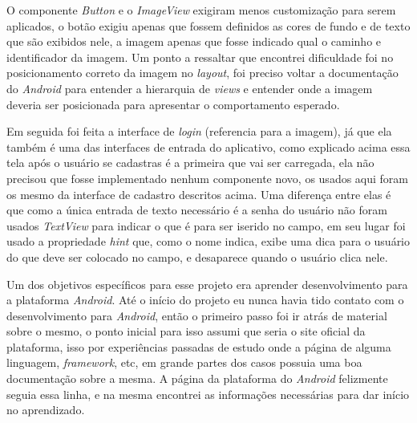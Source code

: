 \documentclass[hidelinks,12pt]{article}
\begin{document}
O componente \textit{Button} e o \textit{ImageView} exigiram menos customiza\c{c}\~ao para serem aplicados, o bot\~ao exigiu apenas que fossem definidos as cores de fundo e de texto que s\~ao exibidos nele, a imagem apenas que fosse indicado qual o caminho e identificador da imagem. Um ponto a ressaltar que encontrei dificuldade foi no posicionamento correto da imagem no \textit{layout}, foi preciso voltar a documenta\c{c}\~ao do \textit{Android} para entender a hierarquia de \textit{views} \cite{viewslay} e entender onde a imagem deveria ser posicionada para apresentar o comportamento esperado.

Em seguida foi feita a interface de \textit{login} (referencia para a imagem), j\'a que ela tamb\'em \'e uma das interfaces de entrada do aplicativo, como explicado acima essa tela ap\'os o usu\'ario se cadastras \'e a primeira que vai ser carregada, ela n\~ao precisou que fosse implementado nenhum componente novo, os usados aqui foram os mesmo da interface de cadastro descritos acima. Uma diferen\c{c}a entre elas \'e que como a única entrada de texto necess\'ario \'e a senha do usu\'ario n\~ao foram usados \textit{TextView} para indicar o que \'e para ser iserido no campo, em seu lugar foi usado a propriedade \textit{hint} que, como o nome indica, exibe uma dica para o usu\'ario do que deve ser colocado no campo, e desaparece quando o usu\'ario clica nele.

Um dos objetivos espec\'ificos para esse projeto era aprender desenvolvimento para a plataforma \textit{Android}. At\'e o in\'icio do projeto eu nunca havia tido contato com o desenvolvimento para \textit{Android}, ent\~ao o primeiro passo foi ir atr\'as de material sobre o mesmo, o ponto inicial para isso assumi que seria o site oficial da plataforma, isso por experiências passadas de estudo onde a p\'agina de alguma linguagem, \textit{framework}, etc, em grande partes dos casos possuia uma boa documenta\c{c}\~ao sobre a mesma. A p\'agina da plataforma do \textit{Android} felizmente seguia essa linha, e na mesma encontrei as informa\c{c}\~oes necess\'arias para dar in\'icio no aprendizado.
\end{document}
